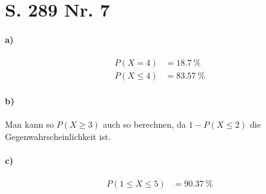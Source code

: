 \documentclass[12pt,a4paper]{report}
\begin{document}
	\section{S. 289 Nr. 7}
	\paragraph{a)}
	\begin{align*}
		P(X=4) &= 18.7\ \% \\
		P(X \leq 4) &= 83.57\ \%
	\end{align*}
	\paragraph{b)}
	Man kann so $P(X\geq 3)$ auch so berechnen, da $1-P(X \leq 2)$ die Gegenwahrscheinlichkeit ist.
	\paragraph{c)}
	\begin{align*}
		P(1 \leq X \leq 5) &= 90.37\ \%
	\end{align*}
\end{document}
